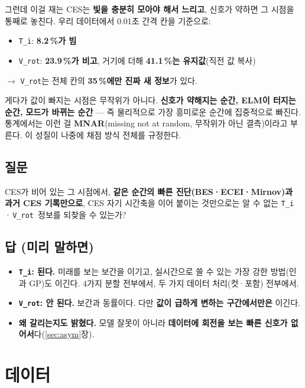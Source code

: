 \documentclass[10pt]{article}
\newcommand{\Ti}{\texttt{T\_i}}
\newcommand{\Vrot}{\texttt{V\_rot}}
\newenvironment{note}{\begin{snugshade}\small}{\end{snugshade}}
\begin{document}
그런데 이걸 재는 CES는 \textbf{빛을 충분히 모아야 해서 느리고}, 신호가 약하면 그 시점을
통째로 놓친다. 우리 데이터에서 0.01초 간격 칸을 기준으로:

\begin{itemize}
\item \Ti: \textbf{8.2\,\%가 빔}
\item \Vrot: \textbf{23.9\,\%가 비고}, 거기에 더해 \textbf{41.1\,\%는 유지값}(직전 값 복사)
\end{itemize}

$\rightarrow$ \Vrot 는 전체 칸의 \textbf{35\,\%에만 진짜 새 정보}가 있다.

게다가 값이 빠지는 시점은 무작위가 아니다. \textbf{신호가 약해지는 순간, ELM이 터지는 순간,
모드가 바뀌는 순간} --- 즉 물리적으로 가장 흥미로운 순간에 집중적으로 빠진다. 통계에서는
이런 걸 \textbf{MNAR}(missing not at random, 무작위가 아닌 결측)이라고 부른다. 이 성질이
나중에 채점 방식 전체를 규정한다.

\subsection{질문}

\begin{note}
CES가 비어 있는 그 시점에서, \textbf{같은 순간의 빠른 진단(BES·ECEI·Mirnov)과 과거 CES
기록만으로}, CES 자기 시간축을 이어 붙이는 것만으로는 알 수 없는 \Ti\,·\,\Vrot\ 정보를
되찾을 수 있는가?
\end{note}

\subsection{답 (미리 말하면)}

\begin{itemize}
\item \textbf{\Ti: 된다.} 미래를 보는 보간을 이기고, 실시간으로 쓸 수 있는 가장 강한
  방법(인과 GP)도 이긴다. 4가지 분할 전부에서, 두 가지 데이터 처리(컷·포함) 전부에서.
\item \textbf{\Vrot: 안 된다.} 보간과 동률이다. 다만 \textbf{값이 급하게 변하는
  구간에서만은} 이긴다.
\item \textbf{왜 갈리는지도 밝혔다.} 모델 잘못이 아니라 \textbf{데이터에 회전을 보는 빠른
  신호가 없어서}다(\ref{sec:asym}장).
\end{itemize}

\section{데이터}
\end{document}
